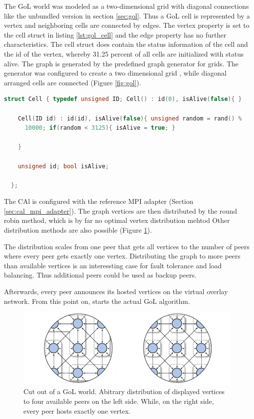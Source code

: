 The GoL world was modeled as a two-dimensional grid with diagonal
connections like the unbundled version in section \ref{sec:gol}. Thus
a GoL cell is represented by a vertex and neighboring cells are
connected by edges. The vertex property is set to the cell struct in
listing \ref{lst:gol_cell} and the edge property has no further
characteristics. The cell struct does contain the status information
of the cell and the id of the vertex, whereby 31.25 percent of all
cells are initialized with status alive.  The graph is generated by
the predefined graph generator for grids. The generator was configured
to create a two dimensional grid , while diagonal arranged cells are
connected (Figure \ref{fig:gol}).

\begin{lstlisting}[language=C++, label=lst:gol_cell]
  struct Cell { typedef unsigned ID; Cell() : id(0), isAlive(false){ }

    Cell(ID id) : id(id), isAlive(false){ unsigned random = rand() %
      10000; if(random < 3125){ isAlive = true; }

    }
    
    unsigned id; bool isAlive;

  };
\end{lstlisting}

The CAl is configured with the reference MPI adapter (Section
\ref{sec:cal_mpi_adapter}).  The graph vertices are then distributed
by the round robin method, which is by far no optimal vertex
distribution mehtod Other distribution methods are also possible
(Figure \ref{fig:gol_mapping}).


The distribution scales from one peer that gets all vertices to the
number of peers where every peer gets exactly one vertex. Distributing
the graph to more peers than available vertices is an interessting
case for fault tolerance and load balancing. Thus additional peers
could be used as backup peers. 

Afterwards, every peer announces its hosted vertices on the virtual
overlay network. From this point on, starts the actual GoL algorithm.

\begin{figure}[H]
  \centering
  \includegraphics[width=\textwidth]{graphics/40_gol_mapping}
  \caption{Cut out of a GoL world. Abitrary distribution of
    displayed vertices to four available peers on the left
    side. While, on the right side, every peer hosts exactly one
    vertex.}
  \label{fig:gol_mapping}
\end{figure}

